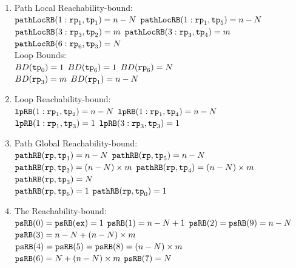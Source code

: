 \begin{enumerate}
$\rprog_1 = \rprepeat(\tpath_1; 3: \rprepeat(\tpath_2; 6: \rprepeat(\tpath_3); \tpath_4); \tpath_5)$
\\
$\rprog_3 = \rprepeat(\tpath_2; 6: \rprepeat(\tpath_3); \tpath_4)$
\\
$\rprog_6 = \rprepeat(\tpath_3)$
  \item {Path Local Reachability-bound}:
\\
$\mathtt{pathLocRB}(1: \mathtt{rp}_1, \mathtt{tp}_1) = n - N$ \quad
$\mathtt{pathLocRB}(1: \mathtt{rp}_1, \mathtt{tp}_5) = n - N$ \\
$\mathtt{pathLocRB}(3: \mathtt{rp}_3, \mathtt{tp}_2) = m$ \quad
$\mathtt{pathLocRB}(3: \mathtt{rp}_3, \mathtt{tp}_4) = m$ \\
$\mathtt{pathLocRB}(6: \mathtt{rp}_6, \mathtt{tp}_3) = N$ \quad
%
\\
Loop Bounds:
\\
$BD(\mathtt{tp}_0) = 1$
\quad
$BD(\mathtt{tp}_6) = 1$
\quad
$BD( \mathtt{rp}_6) = N $
\\
$BD(\mathtt{rp}_3) = m $
\quad
$BD(\mathtt{rp}_1) = n - N $
%
\item Loop Reachability-bound:
\\
$\mathtt{lpRB}(1: \mathtt{rp}_1, \mathtt{tp}_2) = n - N$ \quad 
$\mathtt{lpRB}(1: \mathtt{rp}_1, \mathtt{tp}_4) = n - N$ \\
$\mathtt{lpRB}(1: \mathtt{rp}_1, \mathtt{tp}_3) = 1$ \quad
$\mathtt{lpRB}(3: \mathtt{rp}_3, \mathtt{tp}_3) = 1$ \quad 
%
%
\item Path Global Reachability-bound:
\\
$\mathtt{pathRB}(\mathtt{rp}, \mathtt{tp}_1) = n - N$ \quad
$\mathtt{pathRB}(\mathtt{rp}, \mathtt{tp}_5) = n - N$ \quad
\\
$\mathtt{pathRB}(\mathtt{rp}, \mathtt{tp}_2) = (n - N) \times m$ \quad
$\mathtt{pathRB}(\mathtt{rp}, \mathtt{tp}_4) = (n - N) \times m$ 
\\
$\mathtt{pathRB}(\mathtt{rp}, \mathtt{tp}_3) = N$
\\
$\mathtt{pathRB}(\mathtt{rp}, \mathtt{tp}_6) = 1$ \quad
$\mathtt{pathRB}(\mathtt{rp}, \mathtt{tp}_0) = 1$ 
%
\item The Reachability-bound:
\\
$\mathtt{psRB}(0) = \mathtt{psRB}(\mathtt{ex}) = 1$ \quad
$\mathtt{psRB}(1) = n - N + 1$ \quad
$\mathtt{psRB}(2) = \mathtt{psRB}(9) = n - N$ \\
$\mathtt{psRB}(3) = n - N + (n - N) \times m$ \\
$\mathtt{psRB}(4) = \mathtt{psRB}(5) = \mathtt{psRB}(8) = (n - N) \times m$ \\
$\mathtt{psRB}(6) = N + (n - N) \times m$ \quad
$\mathtt{psRB}(7) = N$ \quad
\end{enumerate}